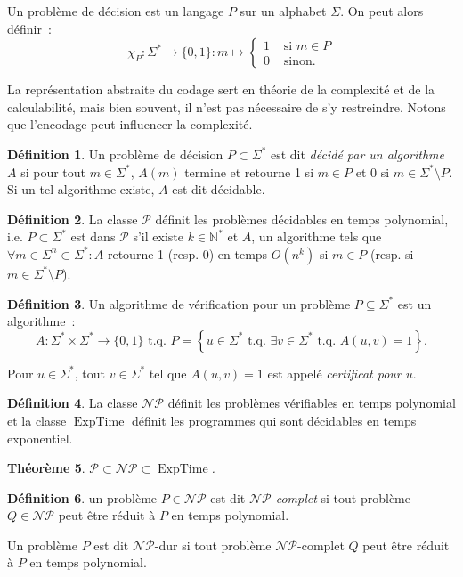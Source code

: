 \documentclass{article}
\newtheorem{thm}{Théorème}[section]
\theoremstyle{definition}
\newtheorem{déf}[thm]{Définition}
\theoremstyle{remark}
\newcommand{\N}{\mathbb N}
\newcommand{\tq}{\text{ t.q. }}
\newcommand{\NP}{\mathcal {NP}}
\DeclareMathOperator{\ExpTime}{ExpTime}
\begin{document}
	Un problème de décision est un langage $P$ sur un alphabet $\Sigma$. On peut alors définir~:
	\[\chi_P : \Sigma^* \to \{0, 1\} : m \mapsto \begin{cases}1 &\text{ si } m \in P \\0 &\text{ sinon}.\end{cases}\]

	La représentation abstraite du codage sert en théorie de la complexité et de la calculabilité, mais bien souvent, il n'est pas nécessaire de s'y restreindre.
	Notons que l'encodage peut influencer la complexité.

	\begin{déf} Un problème de décision $P \subset \Sigma^*$ est dit \textit{décidé par un algorithme $A$} si pour tout $m \in \Sigma^*$,
	$A(m)$ termine et retourne 1 si $m \in P$ et 0 si $m \in \Sigma^* \setminus P$. Si un tel algorithme existe, $A$ est dit décidable.
	\end{déf}

	\begin{déf} La classe $\mathcal P$ définit les problèmes décidables en temps polynomial, i.e. $P \subset \Sigma^*$ est dans $\mathcal P$ s'il existe
	$k \in \N^*$ et $A$, un algorithme tels que $\forall m \in \Sigma^n \subset \Sigma^* : A$ retourne 1 (resp. 0) en temps $O(n^k)$ si
	$m \in P$ (resp. si $m \in \Sigma^* \setminus P$).
	\end{déf}

	\begin{déf} Un algorithme de vérification pour un problème $P \subseteq \Sigma^*$ est un algorithme~:
	\[A : \Sigma^* \times \Sigma^* \to \{0, 1\} \tq P = \left\{u \in \Sigma^* \tq \exists v \in \Sigma^* \tq A(u, v) = 1\right\}.\]

	Pour $u \in \Sigma^*$, tout $v \in \Sigma^*$ tel que $A(u, v) = 1$ est appelé \textit{certificat pour $u$}.
	\end{déf}

	\begin{déf} La classe $\NP$ définit les problèmes vérifiables en temps polynomial et la classe $\ExpTime$ définit les programmes qui sont décidables
	en temps exponentiel.
	\end{déf}

	\begin{thm} $\mathcal P \subset \NP \subset \ExpTime$.
	\end{thm}

	\begin{déf} un problème $P \in \NP$ est dit \textit{$\NP$-complet} si tout problème $Q \in \NP$ peut être réduit à $P$ en temps polynomial.

	Un problème $P$ est dit $\NP$-dur si tout problème $\NP$-complet $Q$ peut être réduit à $P$ en temps polynomial.
	\end{déf}
\end{document}
